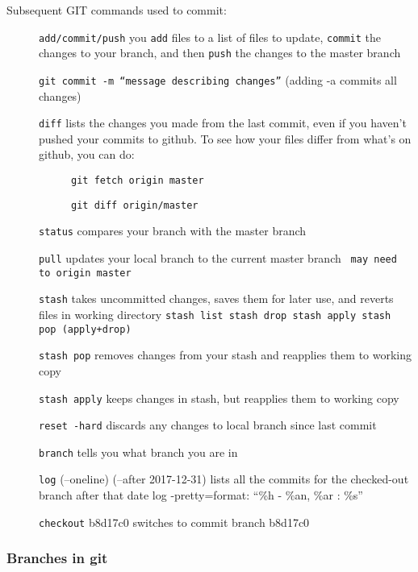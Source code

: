 Subsequent GIT commands used to commit:
\begin{description}
\item[ ] \texttt{add/commit/push}
you \texttt{add} files to a list of files to update, \texttt{commit} the changes to your branch, and then \texttt{push} the changes to the master branch
\item[ ] \texttt{git commit -m ``message describing changes''} (adding -a commits all changes)
\item[ ] \texttt{diff} lists the changes you made from the last commit, even if you haven't pushed your commits to github.    
   To see how your files differ from what's on github, you can do:
\begin{description}
\item[ ] \texttt{git fetch origin master}
\item[ ] \texttt{git diff origin/master}
\end{description}
\item[ ] \texttt{status} compares your branch with the master branch
\item[ ] \texttt{pull} updates your local branch to the current master branch
\newline
\texttt{	may need to origin master}
\item[ ] \texttt{stash} takes uncommitted changes, saves them for later use, and reverts files in working directory
\newline
\texttt{stash list	stash drop	stash apply	stash pop (apply+drop)}
\item[ ] \texttt{stash pop} removes changes from your stash and reapplies them to working copy
\item[ ] \texttt{stash apply} keeps changes in stash, but reapplies them to working copy
\item[ ] \texttt{reset -hard} discards any changes to local branch since last commit
\item[ ] \texttt{branch} tells you what branch you are in
\item[ ] \texttt{log} (--oneline) (--after 2017-12-31) lists all the commits for the checked-out branch after that date
\newline
log -pretty=format: ``\%h - \%an, \%ar : \%s''
\item[ ] \texttt{checkout} b8d17c0 switches to commit branch b8d17c0
\end{description}

\subsubsection{Branches in git}

